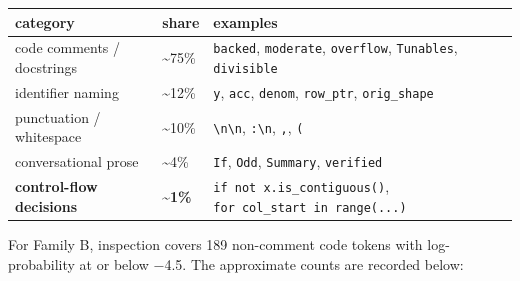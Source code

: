 \documentclass[
  11pt,
]{article}
\begin{document}
\begin{center}
\begin{minipage}{\linewidth}
\centering
\begin{tabular}{@{}
  >{\raggedright\arraybackslash}p{}
  >{\raggedright\arraybackslash}p{}
  >{\raggedright\arraybackslash}p{}@{}}
\toprule
category & share & examples \\
\midrule

code comments / docstrings & \textasciitilde75\% & \texttt{backed},
\texttt{moderate}, \texttt{overflow}, \texttt{Tunables},
\texttt{divisible} \\
identifier naming & \textasciitilde12\% & \texttt{y}, \texttt{acc},
\texttt{denom}, \texttt{row\_ptr}, \texttt{orig\_shape} \\
punctuation / whitespace & \textasciitilde10\% &
\texttt{\textbackslash{}n\textbackslash{}n},
\texttt{:\textbackslash{}n}, \texttt{,}, \texttt{(} \\
conversational prose & \textasciitilde4\% & \texttt{If}, \texttt{Odd},
\texttt{Summary}, \texttt{verified} \\
\textbf{control-flow decisions} & \textbf{\textasciitilde1\%} &
\texttt{if\ not\ x.is\_contiguous()},
\texttt{for\ col\_start\ in\ range(...)} \\
\bottomrule
\end{tabular}
\end{minipage}
\end{center}

For Family B, inspection covers 189 non-comment code tokens with
log-probability at or below −4.5. The approximate counts are recorded
below:
\end{document}
